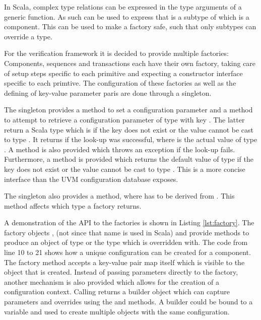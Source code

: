 In Scala, complex type relations can be expressed in the type arguments of a generic function. As such \ttt{[T <:
Component, R <: T]} can be used to express that  is a subtype of  which is a component. This can be
used to make a factory safe, such that only subtypes can override a type. 

For the verification framework it is decided to provide multiple factories: Components, sequences and transactions each have their own factory, taking care of setup steps specific to each primitive and expecting a constructor interface specific to each primtive. The configuration of these factories as well as the defining of key-value parameter paris are done through a  singleton.

The  singleton provides a  method to set a configuration parameter and a  method to attempt to retrieve a configuration parameter of type  with key . The latter return a Scala  type which is  if the key does not exist or the value cannot be cast to type . It returns  if the look-up was successful, where  is the actual value of type . A method  is also provided which throws an exception if the look-up fails. Furthermore, a  method is provided which returns the default value of type  if the key does not exist or the value cannot be cast to type . This is a more concise interface than the UVM configuration database exposes.

The  singleton also provides a  method, where  has to be derived from . This method affects which type a factory returns.

A demonstration of the API to the factories is shown in Listing \ref{lst:factory}. The factory objects ,  (not  since that name is used in Scala) and  provide  methods to produce an object of type  or the type which  is overridden with. The code from line 10 to 21 shows how a unique configuration can be created for a component. The factory  method accepts a key-value pair map itself which is visible to the object that is created. Instead of passing parameters directly to the factory, another mechanism is also provided which allows for the creation of a configuration context. Calling  returns a builder object which can capture parameters and overrides using the  and  methods. A builder could be bound to a variable and used to create multiple objects with the same configuration. 

